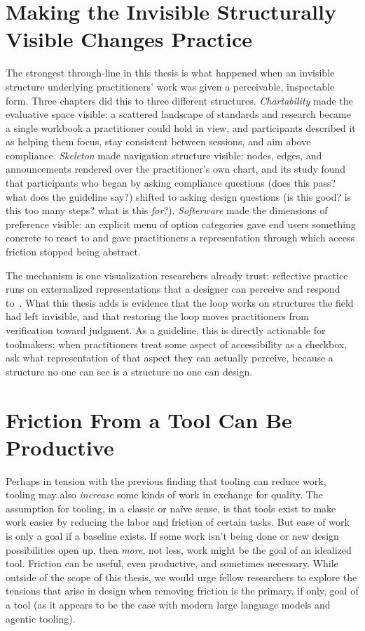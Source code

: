 \documentclass[12pt]{cmuthesis}
\begin{document}
\section{Making the Invisible Structurally Visible Changes Practice}

The strongest through-line in this thesis is what happened when an invisible structure underlying practitioners' work was given a perceivable, inspectable form. Three chapters did this to three different structures. \textit{Chartability} made the evaluative space visible: a scattered landscape of standards and research became a single workbook a practitioner could hold in view, and participants described it as helping them focus, stay consistent between sessions, and aim above compliance. \textit{Skeleton} made navigation structure visible: nodes, edges, and announcements rendered over the practitioner's own chart, and its study found that participants who began by asking compliance questions (does this pass? what does the guideline say?) shifted to asking design questions (is this good? is this too many steps? what is this \textit{for}?). \textit{Softerware} made the dimensions of preference visible: an explicit menu of option categories gave end users something concrete to react to and gave practitioners a representation through which access friction stopped being abstract.

The mechanism is one visualization researchers already trust: reflective practice runs on externalized representations that a designer can perceive and respond to~\cite{Schon1996Relective}. What this thesis adds is evidence that the loop works on structures the field had left invisible, and that restoring the loop moves practitioners from verification toward judgment. As a guideline, this is directly actionable for toolmakers: when practitioners treat some aspect of accessibility as a checkbox, ask what representation of that aspect they can actually perceive, because a structure no one can see is a structure no one can design.

\section{Friction From a Tool Can Be Productive}

Perhaps in tension with the previous finding that tooling can reduce work, tooling may also \textit{increase} some kinds of work in exchange for quality. The assumption for tooling, in a classic or na\"ive sense, is that tools exist to make work easier by reducing the labor and friction of certain tasks. But ease of work is only a goal if a baseline exists. If some work isn't being done or new design possibilities open up, then \textit{more}, not less, work might be the goal of an idealized tool. Friction can be useful, even productive, and sometimes necessary. While outside of the scope of this thesis, we would urge fellow researchers to explore the tensions that arise in design when removing friction is the primary, if only, goal of a tool (as it appears to be the case with modern large language models and agentic tooling).
\end{document}
